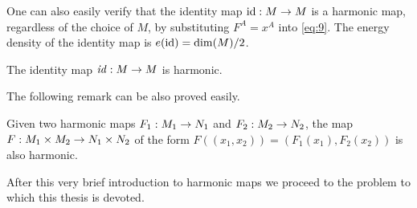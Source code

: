 One can also easily verify that the identity map $\text{id}:M\rightarrow M$ is a
harmonic map, regardless of the choice of $M$, by substituting
$F^A=x^A$ into \eqref{eq:9}. The energy density of the identity map
is $e(\text{id})=\dim(M)/2$.\\

\begin{remark}\label{rem:1}
  The identity map $\text{\emph{id}}:M\rightarrow M$ is harmonic.
\end{remark}

The following remark can be also proved easily.

\begin{remark}\label{rem:2}
  Given two harmonic maps $F_1:M_1\rightarrow N_1$ and $F_2:M_2\rightarrow N_2$, the
  map $F:M_1\times M_2\rightarrow N_1\times N_2$ of the form
  $F((x_1,x_2))=(F_1(x_1),F_2(x_2))$ is also harmonic.
\end{remark}

After this very brief introduction to harmonic maps we proceed to the
problem to which this thesis is devoted.


